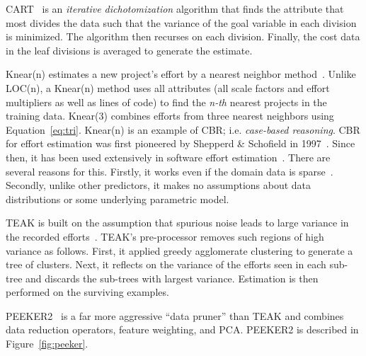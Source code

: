 \documentclass{sig-alternate}
\newcommand{\fig}[1]{Figure~\ref{fig:#1}}
\newenvironment{changed}{\par\color{MyDarkBlue}}{\par}
\begin{document}
CART~\cite{breiman84} is an {\em iterative dichotomization} algorithm
that finds the attribute that most divides the data such that
the variance of the goal variable in each division is minimized.
The algorithm then recurses on each division. 
Finally, the cost data in the leaf divisions
is averaged to generate the estimate. 


Knear(n) estimates a new project's effort
by a nearest neighbor  method~\cite{shepperd97}. Unlike LOC(n),
a Knear(n) method uses all attributes
(all scale factors and effort multipliers as well as lines of code)
to find the {\em n-th} nearest projects in the training data. 
Knear(3) combines efforts from three nearest neighbors using
Equation~\ref{eq:tri}.
Knear(n) is an example of CBR; i.e.  {\em case-based reasoning}.
CBR for effort estimation was 
first pioneered by Shepperd \& Schofield
in 1997~\cite{shepperd97}.
  Since then, it 
has been used extensively in software effort
estimation~\cite{Auer2006,Walkerden1999,%
  Kirsopp2002,shepperd97,kadoda00,Li2008,Li2006,Li2007,Li2009a,
  keung2008a,keung2008b,keung2008c}.  
There are several reasons  for this. Firstly, 
it works even if the domain data is sparse~\cite{Myrtveit}.
Secondly, 
unlike other predictors, it makes no assumptions about data
distributions or some  underlying parametric model. 

\begin{changed}
TEAK is built
on the assumption that spurious noise leads to large variance in the recorded efforts~\cite{koc11b}.
TEAK's pre-processor removes such regions of high variance as follows.
First, it  applied greedy agglomerate clustering  to generate a tree of clusters.
Next, it reflects on the variance
of the efforts seen in each sub-tree and discards the sub-trees with largest variance. Estimation is then performed
on the surviving examples.

PEEKER2~\cite{papa13} is a far more aggressive ``data pruner'' than TEAK and combines   data reduction operators, 
feature weighting,  and PCA. PEEKER2 is described in  \fig{peeker}.
\end{changed}
\end{document}
